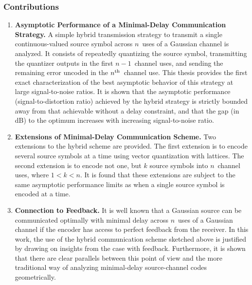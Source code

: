 \subsubsection{Contributions}

\begin{enumerate}

  \item \textbf{Asymptotic Performance of a Minimal-Delay Communication
    Strategy.} A simple hybrid transmission strategy to transmit a single
    continuous-valued source symbol across $n$~uses of a Gaussian channel is
    analyzed. It consists of repeatedly quantizing the source symbol,
    transmitting the quantizer outputs in the first $n-1$~channel uses, and
    sending the remaining error uncoded in the $n{^{\text{th}}}$~channel use. This thesis
    provides the first exact characterization of the best asymptotic behavior of
    this strategy at large signal-to-noise ratios. It is shown that the
    asymptotic performance (signal-to-distortion ratio) achieved by the hybrid
    strategy is strictly bounded away from that achievable without a delay
    constraint, and that the gap (in dB) to the optimum increases with
    increasing signal-to-noise ratio.

  \item \textbf{Extensions of Minimal-Delay Communication Scheme.} Two
    extensions to the hybrid scheme are provided. The first extension is to
    encode several source symbols at a time using vector quantization with
    lattices. The second extension is to encode not one, but $k$ source symbols
    into $n$~channel uses, where $1 < k < n$. It is found that these extensions
    are subject to the same asymptotic performance limits as when a single
    source symbol is encoded at a time.

  \item \textbf{Connection to Feedback.} It is well known that a Gaussian source
    can be communicated optimally with minimal delay across $n$~uses of a
    Gaussian channel if the encoder has access to perfect feedback from the
    receiver. In this work,  the use of the hybrid communication scheme sketched
    above is justified by drawing on insights from the case with feedback.
    Furthermore, it is shown that there are clear parallels between this point
    of view and the more traditional way of analyzing minimal-delay
    source-channel codes geometrically. 


\end{enumerate}
